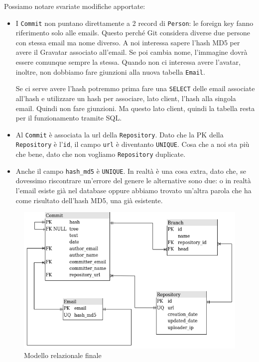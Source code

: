 Possiamo notare svariate modifiche apportate:
\begin{itemize}
\item I \verb|Commit| non puntano direttamente a 2 record di \verb|Person|: le foreign key fanno riferimento solo alle emails. Questo perché Git considera diverse due persone con stessa email ma nome diverso. A noi interessa sapere l'hash MD5 per avere il Gravatar associato all'email. Se poi cambia nome, l'immagine dovrà essere comunque sempre la stessa. Quando non ci interessa avere l'avatar, inoltre, non dobbiamo fare giunzioni alla nuova tabella \verb|Email|.

Se ci serve avere l'hash potremmo prima fare una \verb|SELECT| delle email associate all'hash e utilizzare un hash per associare, lato client, l'hash alla singola email. Quindi non fare giunzioni. Ma questo lato client, quindi la tabella resta per il funzionamento tramite SQL.

\item Al \verb|Commit| è associata la url della \verb|Repository|. Dato che la PK della \verb|Repository| è l'\verb|id|, il campo \verb|url| è diventanto \verb|UNIQUE|. Cosa che a noi sta più che bene, dato che non vogliamo \verb|Repository| duplicate.

\item Anche il campo \verb|hash_md5| è \verb|UNIQUE|. In realtà è una cosa extra, dato che, se dovessimo riscontrare un'errore del genere le alternative sono due: o in realtà l'email esiste già nel database oppure abbiamo trovato un'altra parola che ha come risultato dell'hash MD5, una già esistente.
\end{itemize}

\begin{figure}[htp]
\centering
\includegraphics[scale=0.7]{data/relation_final.png}
\caption{Modello relazionale finale}
\label{}
\end{figure}